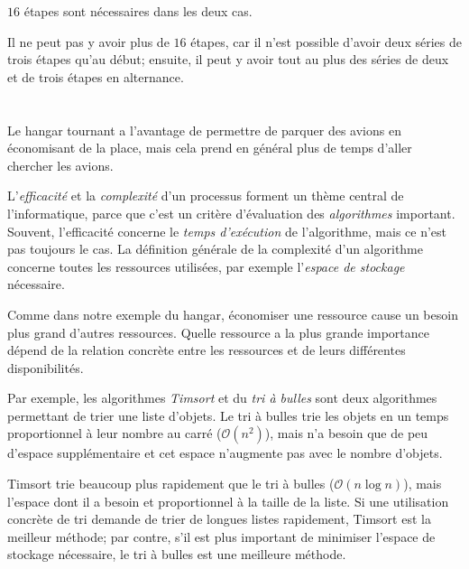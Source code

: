 {{$16$ étapes sont nécessaires dans les deux cas.

Il ne peut pas y avoir plus de $16$ étapes, car il n’est possible d’avoir deux séries de trois étapes qu’au début; ensuite, il peut y avoir tout au plus des séries de deux et de trois étapes en alternance.



\section*{\BrochureItsInformatics}
Le hangar tournant a l’avantage de permettre de parquer des avions en économisant de la place, mais cela prend en général plus de temps d’aller chercher les avions.

L’\emph{efficacité} et la \emph{complexité} d’un processus forment un thème central de l’informatique, parce que c’est un critère d’évaluation des \emph{algorithmes} important. Souvent, l’efficacité concerne le \emph{temps d’exécution} de l’algorithme, mais ce n’est pas toujours le cas. La définition générale de la complexité d’un algorithme concerne toutes les ressources utilisées, par exemple l’\emph{espace de stockage} nécessaire.

Comme dans notre exemple du hangar, économiser une ressource cause un besoin plus grand d’autres ressources. Quelle ressource a la plus grande importance dépend de la relation concrète entre les ressources et de leurs différentes disponibilités.

Par exemple, les algorithmes \emph{Timsort} et du \emph{tri à bulles} sont deux algorithmes permettant de trier une liste d’objets. Le tri à bulles trie les objets en un temps proportionnel à leur nombre au carré (${\mathcal{O}(n^2)}$), mais n’a besoin que de peu d’espace supplémentaire et cet espace n’augmente pas avec le nombre d’objets.

Timsort trie beaucoup plus rapidement que le tri à bulles (${\mathcal{O}(n\log{}n)}$), mais l’espace dont il a besoin et proportionnel à la taille de la liste. Si une utilisation concrète de tri demande de trier de longues listes rapidement, Timsort est la meilleur méthode; par contre, s’il est plus important de minimiser l’espace de stockage nécessaire, le tri à bulles est une meilleure méthode.



}}
